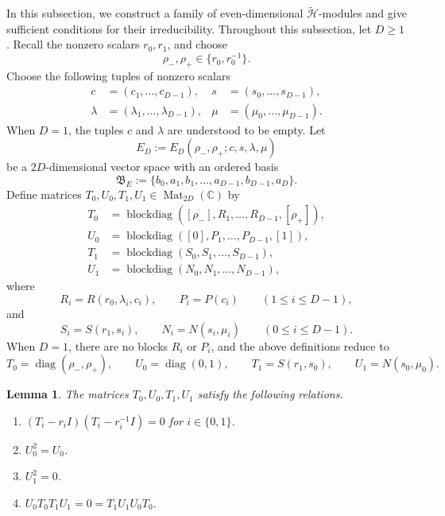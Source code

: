 \documentclass[reqno]{amsart}
\newtheorem{lemma}[theorem]{Lemma}
\theoremstyle{definition}
\begin{document}
In this subsection, we construct a family of even-dimensional
$\widetilde{\mathcal{H}}$-modules and give sufficient conditions for their
irreducibility. 
Throughout this subsection, let $D\geq 1$.
Recall the nonzero scalars $r_0,r_1$, and choose
\begin{equation}
\rho_-,\rho_+ \in \{r_0,r_0^{-1}\}.
\label{even rho}
\end{equation}
Choose the following tuples of nonzero scalars
\begin{align}
&&  c & = (c_1,\dots,c_{D-1}), & s &= (s_0,\dots,s_{D-1}), && \label{even cs 1}\\
&&  \lambda & = (\lambda_1,\dots,\lambda_{D-1}), & \mu &= (\mu_0,\dots,\mu_{D-1}). &&\label{even lambda mu 2}
\end{align}
When $D=1$, the tuples $c$ and $\lambda$ are understood to be empty.
Let
$$
E_D:=E_D(\rho_-,\rho_+;c,s,\lambda,\mu)
$$
be a $2D$-dimensional vector space with an ordered basis
$$
\mathfrak{B}_E := \{b_0,a_1,b_1,\dots,a_{D-1},b_{D-1},a_D\}.
$$
Define matrices $T_0,U_0,T_1,U_1 \in \operatorname{Mat}_{2D}(\mathbb{C})$ by
\begin{align}
T_0&=\operatorname{blockdiag}
([\rho_-],R_1,\dots,R_{D-1},[\rho_+]),
\label{e.mat:T0}\\
U_0&=\operatorname{blockdiag}
([0],P_1,\dots,P_{D-1},[1]),
\label{e.mat:U0}\\
T_1&=\operatorname{blockdiag}
(S_0,S_1,\dots,S_{D-1}),
\label{e.mat:T1}\\
U_1&=\operatorname{blockdiag}
(N_0,N_1,\dots,N_{D-1}),
\label{e.mat:U1}
\end{align}
where
$$
R_i=R(r_0,\lambda_i,c_i),\qquad
P_i=P(c_i)
\qquad (1\leq i\leq D-1),
$$
and
$$
S_i=S(r_1,s_i),\qquad
N_i=N(s_i,\mu_i)
\qquad (0\leq i\leq D-1).
$$
When $D=1$, there are no blocks $R_i$ or $P_i$, and the above definitions reduce to
$$
T_0=\operatorname{diag}(\rho_-,\rho_+),\qquad
U_0=\operatorname{diag}(0,1),\qquad
T_1=S(r_1,s_0),\qquad
U_1=N(s_0,\mu_0).
$$

\begin{lemma}\label{nil-DAHA condition}
%
The matrices $T_0,U_0,T_1,U_1$ satisfy the following relations.
\begin{enumerate}
\item[\rm(i)] $(T_i-r_iI)(T_i-r_i^{-1}I)=0$ for $i\in\{0,1\}$.
\item[\rm(ii)] $U_0^2=U_0$.
\item[\rm(iii)] $U_1^2=0$.
\item[\rm(iv)] $U_0T_0T_1U_1=0=T_1U_1U_0T_0$.
\end{enumerate}
%
\end{lemma}
\end{document}
